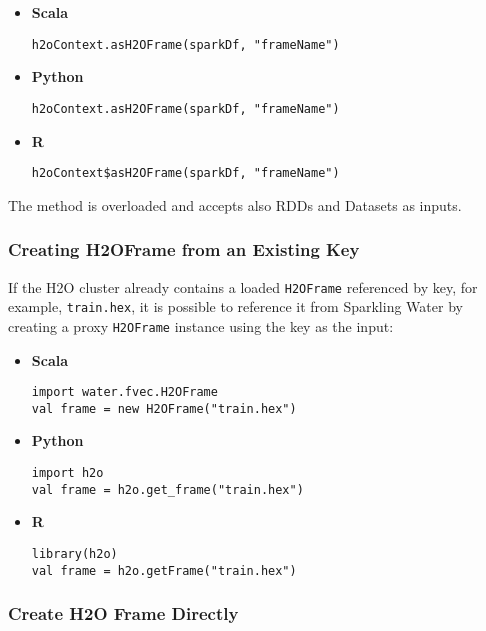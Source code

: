 \documentclass{standalone}
\begin{document}
    \begin{itemize}
        \item \textbf{Scala} \begin{lstlisting}[style=Scala]
h2oContext.asH2OFrame(sparkDf, "frameName")
        \end{lstlisting}
        \item \textbf{Python} \begin{lstlisting}[style=Python]
h2oContext.asH2OFrame(sparkDf, "frameName")
        \end{lstlisting}
        \item \textbf{R} \begin{lstlisting}[style=R]
h2oContext$asH2OFrame(sparkDf, "frameName")
        \end{lstlisting}
    \end{itemize}

    The method is overloaded and accepts also RDDs and Datasets as inputs.

    \subsubsection{Creating H2OFrame from an Existing Key}

    If the H2O cluster already contains a loaded \texttt{H2OFrame} referenced by key, for example, \texttt{train.hex}, it
    is possible to reference it from Sparkling Water by creating a proxy \texttt{H2OFrame} instance using the key as the input:

    \begin{itemize}
        \item \textbf{Scala} \begin{lstlisting}[style=Scala]
import water.fvec.H2OFrame
val frame = new H2OFrame("train.hex")
        \end{lstlisting}
        \item \textbf{Python} \begin{lstlisting}[style=Python]
import h2o
val frame = h2o.get_frame("train.hex")
        \end{lstlisting}
        \item \textbf{R} \begin{lstlisting}[style=R]
library(h2o)
val frame = h2o.getFrame("train.hex")
        \end{lstlisting}
    \end{itemize}

    \subsubsection{Create H2O Frame Directly}
\end{document}
